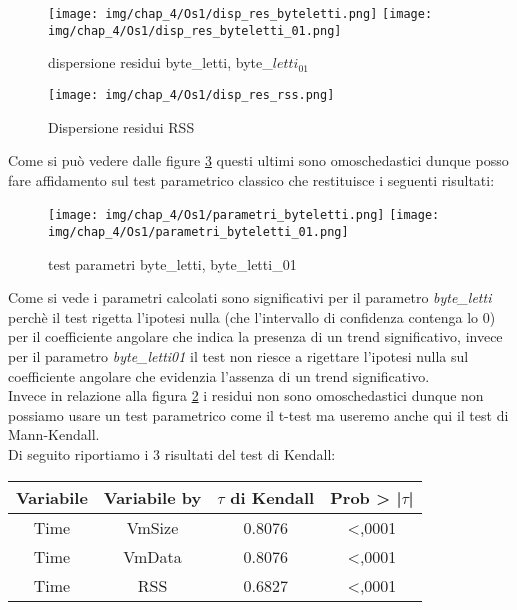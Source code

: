 \begin{figure}[H]
    \centering
    \texttt{[image: img/chap\_4/Os1/disp\_res\_byteletti.png]}
    \texttt{[image: img/chap\_4/Os1/disp\_res\_byteletti\_01.png]}
    \caption{dispersione residui byte\_letti, byte\_$letti_{01}$}
    \label{fig:residui_omoschedastici}
\end{figure}
\begin{figure}[H]
    \centering
    \texttt{[image: img/chap\_4/Os1/disp\_res\_rss.png]}
    \caption{Dispersione residui RSS}
    \label{fig:residui_non_omoschedastici}
\end{figure}
\noindent
Come si può vedere dalle figure \ref{fig:residui_omoschedastici} questi ultimi sono omoschedastici dunque posso fare affidamento sul test parametrico classico che restituisce i seguenti risultati:
\begin{figure}[H]
    \centering
    \texttt{[image: img/chap\_4/Os1/parametri\_byteletti.png]}
    \texttt{[image: img/chap\_4/Os1/parametri\_byteletti\_01.png]}
    \caption{test parametri byte\_letti, byte\_letti\_01}
    \label{fig:residui_omoschedastici}
\end{figure}
\noindent
Come si vede i parametri calcolati sono significativi per il parametro \textit{byte\_letti} perchè il test rigetta l'ipotesi nulla (che l'intervallo di confidenza contenga lo 0) per il coefficiente angolare che indica la presenza di un trend significativo, invece per il parametro \textit{byte\_letti01} il test non riesce a rigettare l'ipotesi nulla sul coefficiente angolare che evidenzia l'assenza di un trend significativo.\\
Invece in relazione alla figura \ref{fig:residui_non_omoschedastici} i residui non sono omoschedastici dunque non possiamo usare un test parametrico come il t-test ma useremo anche qui il test di Mann-Kendall.\\
Di seguito riportiamo i 3 risultati del test di Kendall:
\begin{table}[htbp]
    \centering
    \label{tab:esempio}
    \begin{tabular}{|c|c|c|c|} %
        \hline
        Variabile & Variabile by & $\tau$ di Kendall &Prob > |$\tau$| \\ %
        \hline
        Time & VmSize & 0.8076 & <,0001\\
        Time & VmData & 0.8076 & <,0001\\
        Time & RSS & 0.6827 & <,0001\\
        \hline
    \end{tabular}
\end{table}
